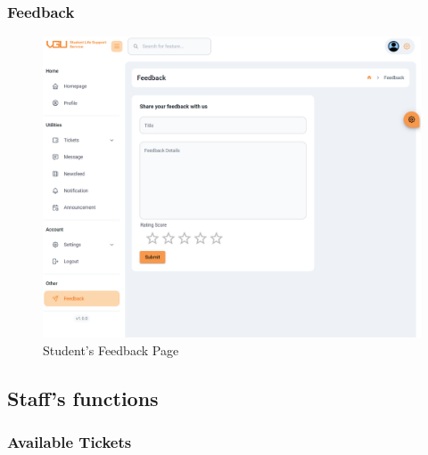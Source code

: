 	
	\subsubsection{Feedback}
	\begin{figure}[H]
		\centering
		\includegraphics[width=1.0\linewidth]{graphics/gui/student/feedback}
		\caption{Student's Feedback Page}
		\label{fig:gui-std-feedback}
	\end{figure}
	
	
\subsection{Staff's functions}

	\subsubsection{Available Tickets}
	
	
	
	

	
	
	
	
	
	
	
	
	
	



